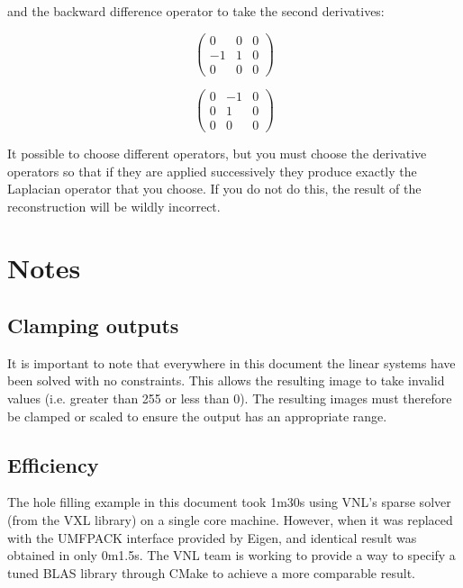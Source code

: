 \documentclass{InsightArticle}
\begin{document}
and the backward difference operator to take the second derivatives:

\begin{figure}[H]
  \begin{minipage}[b]{0.5\linewidth}
    \centering

    \begin{equation}
    \begin{pmatrix}
    0 & 0 & 0 \\
    -1 & 1 & 0\\
    0 & 0 & 0
    \end{pmatrix}
    \end{equation}

  \end{minipage}
    \hspace{0.5cm}
  \begin{minipage}[b]{0.5\linewidth}

    \begin{equation}
    \begin{pmatrix}
    0 & -1 & 0 \\
    0 & 1 & 0\\
    0 & 0 & 0
    \end{pmatrix}
    \end{equation}

  \end{minipage}
\end{figure}

It possible to choose different operators, but you must choose the derivative operators so that if they are applied successively they produce exactly the Laplacian operator that you choose. If you do not do this, the result of the reconstruction will be wildly incorrect.

\section{Notes}
\subsection{Clamping outputs}
It is important to note that everywhere in this document the linear systems have been solved with no constraints. This allows the resulting image to take invalid values (i.e. greater than 255 or less than 0). The resulting images must therefore be clamped or scaled to ensure the output has an appropriate range.

\subsection{Efficiency}
The hole filling example in this document took 1m30s using VNL's sparse solver (from the VXL library) on a single core machine. However, when it was replaced with the UMFPACK interface provided by Eigen, and identical result was obtained in only 0m1.5s. The VNL team is working to provide a way to specify a tuned BLAS library through CMake to achieve a more comparable result.


\end{document}
